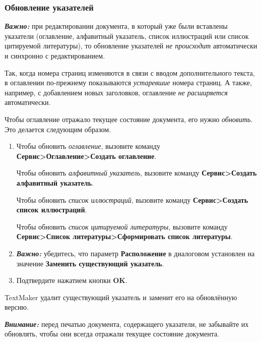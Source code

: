 ﻿\documentclass[a4paper,10pt]{article}
\begin{document}
\subsubsection{Обновление указателей}
\begin{mdframed}[backgroundcolor=blue!10]
\textbf{\textit{Важно:}} при редактировании документа, в который уже были вставлены указатели (оглавление, алфавитный указатель, список иллюстраций или список цитируемой литературы), то обновление указателей \textit{не происходит} автоматически и синхронно с редактированием.
\end{mdframed}

Так, когда номера страниц изменяются в связи с вводом дополнительного текста, в оглавлении по-прежнему показываются \textit{устаревшие} номера страниц. А также, например, с добавлением новых заголовков, оглавление \textit{не расширяется} автоматически.

Чтобы оглавление отражало текущее состояние документа, его нужно \textit{обновить}. Это делается следующим образом.

\begin{enumerate}
 \item Чтобы обновить \textit{оглавление}, вызовите команду \textbf{Сервис>Оглавление>Создать оглавление}.
 
 Чтобы обновить \textit{алфавитный указатель}, вызовите команду \textbf{Сервис>Создать алфавитный указатель}.
 
 Чтобы обновить \textit{список иллюстраций}, вызовите команду \textbf{Сервис>Создать список иллюстраций}.
 
 Чтобы обновить \textit{список цитируемой литературы}, вызовите команду \textbf{Сервис>Список литературы>Сформировать список литературы}.
 \item \textit{\textbf{Важно:}} убедитесь, что параметр \textbf{Расположение} в диалоговом установлен на значение \textbf{Заменить существующий указатель}.
 \item Подтвердите нажатием кнопки \textbf{OK}.
\end{enumerate}

TextMaker удалит существующий указатель и заменит его на обновлённую версию.

\begin{mdframed}[backgroundcolor=blue!10]
\textbf{\textit{Внимание:}} перед печатью документа, содержащего указатели, не забывайте их обновлять, чтобы они всегда отражали текущее состояние документа. 
\end{mdframed}
\end{document}
